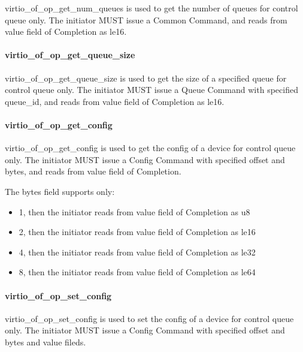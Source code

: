 virtio_of_op_get_num_queues is used to get the number of queues for control queue only. The initiator MUST issue a Common Command, and reads from value field of Completion as le16.

\paragraph{virtio_of_op_get_queue_size}\label{sec:Virtio Transport Options / Virtio Over Fabrics / Transmition Protocol / Opcodes Definition / virtio_of_op_get_queue_size}

virtio_of_op_get_queue_size is used to get the size of a specified queue for control queue only. The initiator MUST issue a Queue Command with specified queue_id, and reads from value field of Completion as le16.

\paragraph{virtio_of_op_get_config}\label{sec:Virtio Transport Options / Virtio Over Fabrics / Transmition Protocol / Opcodes Definition / virtio_of_op_get_config}

virtio_of_op_get_config is used to get the config of a device for control queue only. The initiator MUST issue a Config Command with specified offset and bytes, and reads from value field of Completion.

The bytes field supports only:

\begin{itemize}
\item 1, then the initiator reads from value field of Completion as u8
\item 2, then the initiator reads from value field of Completion as le16
\item 4, then the initiator reads from value field of Completion as le32
\item 8, then the initiator reads from value field of Completion as le64
\end{itemize}

\paragraph{virtio_of_op_set_config}\label{sec:Virtio Transport Options / Virtio Over Fabrics / Transmition Protocol / Opcodes Definition / virtio_of_op_set_config}

virtio_of_op_set_config is used to set the config of a device for control queue only. The initiator MUST issue a Config Command with specified offset and bytes and value fileds.

